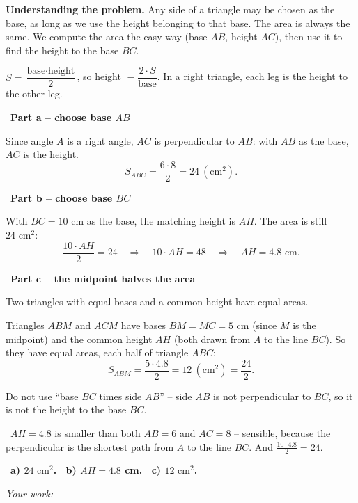 \documentclass[11pt]{article}
\newif\ifsol \solfalse
\providecommand{\AnsWord}{Đáp số}
\newcommand{\ans}[1]{\par\smallskip{\bfseries\color{tmGreen!88!black}\AnsWord:}\ {\bfseries\color{AnsRed}#1}\par}
\newcommand{\probsol}[1]{%
  \begin{lrbox}{\solmeasure}\begin{minipage}{\dimexpr\linewidth-24pt\relax}#1\end{minipage}\end{lrbox}%
  \ifsol
    \begin{solbox}#1\end{solbox}%
  \else
    \setlength{\solht}{\dimexpr\ht\solmeasure+\dp\solmeasure+0.85cm\relax}%
    \ifdim\solht<1.35cm\setlength{\solht}{1.35cm}\fi
    \ifdim\solht>\StudentMaxWork\setlength{\solht}{\StudentMaxWork}\fi
    \begin{tcolorbox}[colback=white,colframe=Line,boxrule=0.8pt,arc=5pt,
      left=8pt,right=8pt,top=4pt,bottom=4pt,height=\solht]{\footnotesize\color{Slate}\itshape\WorkWord}\end{tcolorbox}%
  \fi}
\newlength{\StudentMaxWork}\setlength{\StudentMaxWork}{7.5cm}
\newcommand{\step}[2]{\par\smallskip\noindent{\bfseries\color{tmBlue!85!black}\StepWord~#1.}\ {\bfseries #2}\par\nopagebreak}
\newcommand{\verify}[1]{\par\smallskip\noindent{\bfseries\color{tmGreen!80!black}\faCheckCircle\ \CheckWord}\ #1\par}
\def\WorkWord{Your work:}
\def\AnsWord{Answer}
\def\StepWord{Step}
\def\CheckWord{Check:}
\begin{document}
\probsol{
\textbf{Understanding the problem.} Any side of a triangle may be chosen as the base, as long as we use the height belonging to that base. The area is always the same. We compute the area the easy way (base $AB$, height $AC$), then use it to find the height to the base $BC$.
\begin{recallbox}$S=\dfrac{\text{base}\cdot\text{height}}{2}$, so height $=\dfrac{2\cdot S}{\text{base}}$. In a right triangle, each leg is the height to the other leg.\end{recallbox}
\step{1}{Part a -- choose base $AB$}
Since angle $A$ is a right angle, $AC$ is perpendicular to $AB$: with $AB$ as the base, $AC$ is the height.
\[ S_{ABC}=\frac{6\cdot8}{2}=24\ (\text{cm}^2). \]

\step{2}{Part b -- choose base $BC$}
With $BC=10$ cm as the base, the matching height is $AH$. The area is still $24\text{ cm}^2$:
\[ \frac{10\cdot AH}{2}=24\quad\Rightarrow\quad 10\cdot AH=48\quad\Rightarrow\quad AH=4.8\text{ cm}. \]

\step{3}{Part c -- the midpoint halves the area}
\begin{recallbox}Two triangles with equal bases and a common height have equal areas.\end{recallbox}
Triangles $ABM$ and $ACM$ have bases $BM=MC=5$ cm (since $M$ is the midpoint) and the common height $AH$ (both drawn from $A$ to the line $BC$). So they have equal areas, each half of triangle $ABC$:
\[ S_{ABM}=\frac{5\cdot4.8}{2}=12\ (\text{cm}^2)=\frac{24}{2}. \]
\begin{warnbox}Do not use ``base $BC$ times side $AB$'' -- side $AB$ is not perpendicular to $BC$, so it is not the height to the base $BC$.\end{warnbox}
\verify{$AH=4.8$ is smaller than both $AB=6$ and $AC=8$ -- sensible, because the perpendicular is the shortest path from $A$ to the line $BC$. And $\frac{10\cdot4.8}{2}=24$.}
\ans{a) $24\text{ cm}^2$. \ b) $AH=4.8$ cm. \ c) $12\text{ cm}^2$.}
}

\providecommand{\tbGrid}[4]{\begin{tikzpicture}[baseline=0.2cm,x=0.5cm,y=0.5cm]
  \draw[Ink,line width=0.7pt] (0,0) grid[step=1] (2,2);
  \node[font=\sffamily\bfseries,text=tmBlue!80!black,inner sep=0pt,#4] at (#1,#2) {#3};\end{tikzpicture}}
\providecommand{\tbG}[6]{\draw[Ink,line width=0.7pt] (#1,#2) grid[step=0.5] ++(1,1);
  \node[font=\sffamily\bfseries,text=tmBlue!80!black,inner sep=0pt,#6] at ({#1+#3},{#2+#4}) {#5};}
\end{document}

